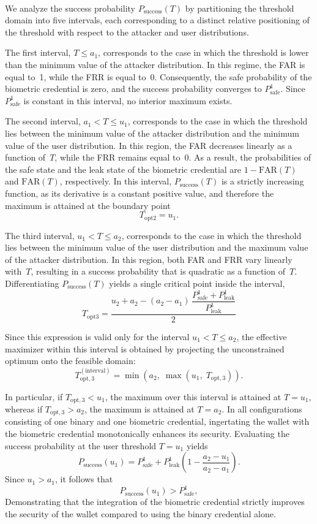 \documentclass[sigconf]{acmart}
\theoremstyle{definition}
\begin{document}
\Psuccess
\\

We analyze the success probability $P_{\text{success}}(T)$ by partitioning the threshold domain into five intervals, each corresponding to a distinct relative positioning of the threshold with respect to the attacker and user distributions.

The first interval, $T \le a_1$, corresponds to the case in which the threshold is lower than the minimum value of the attacker distribution. In this regime, the FAR is equal to~1, while the FRR is equal to~0. Consequently, the safe probability of the biometric credential is zero, and the success probability converges to $P^{1}_{\text{safe}}$. Since $P^{1}_{\text{safe}}$ is constant in this interval, no interior maximum exists.

The second interval, $a_1 < T \le u_1$, corresponds to the case in which the threshold lies between the minimum value of the attacker distribution and the minimum value of the user distribution. In this region, the FAR decreases linearly as a function of~$T$, while the FRR remains equal to~0. As a result, the probabilities of the safe state and the leak state of the biometric credential are $1-\text{FAR}(T)$ and $\text{FAR}(T)$, respectively. In this interval, $P_{\text{success}}(T)$ is a strictly increasing function, as its derivative is a constant positive value, and therefore the maximum is attained at the boundary point
\[
T_{\text{opt2}} = u_1 .
\]

The third interval, $u_1 < T \le a_2$, corresponds to the case in which the threshold lies between the minimum value of the user distribution and the maximum value of the attacker distribution. In this region, both FAR and FRR vary linearly with~$T$, resulting in a success probability that is quadratic as a function of~$T$. Differentiating $P_{\text{success}}(T)$ yields a single critical point inside the interval,
\[
T_{\text{opt3}}
=
\frac{
u_2 + a_2
- (a_2 - a_1)\,\dfrac{P^{1}_{\text{safe}} + P^{1}_{\text{leak}}}{P^{1}_{\text{leak}}}
}{2}
\]

Since this expression is valid only for the interval
$u_1 < T \le a_2$, the effective maximizer within this interval
is obtained by projecting the unconstrained optimum onto the
feasible domain:
\[
T_{\text{opt},3}^{(\text{interval})}
=
\min\!\left(
a_2,\;
\max\!\left(u_1,\; T_{\text{opt},3}\right)
\right).
\]

In particular, if $T_{\text{opt},3} < u_1$, the maximum over this interval is  attained at $T=u_1$, whereas if $T_{\text{opt},3} > a_2$, the maximum is attained at $T=a_2$.
In all configurations consisting of one binary and one biometric credential, ingertating the wallet with the biometric credential monotonically enhances its security. Evaluating the success probability at the user threshold $T=u_1$ yields
\[
P_{\text{success}}(u_1)
=
P^{1}_{\text{safe}} + P^{1}_{\text{leak}}(1
- \frac{a_2 - u_1}{a_2 - a_1}).
\]
Since $u_1 > a_1$, it follows that
\[
P_{\text{success}}(u_1) > P^{1}_{\text{safe}},
\]
Demonstrating that the integration of the biometric credential strictly improves the security of the wallet compared to using the binary credential alone.
\end{document}
